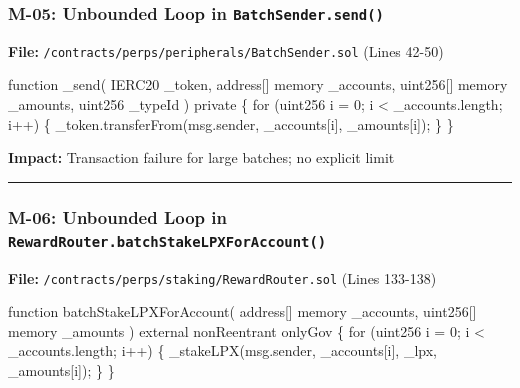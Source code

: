 \documentclass[
]{article}
\newenvironment{Shaded}{}{}
\newcommand{\NormalTok}[1]{#1}
\begin{document}
\subsubsection{\texorpdfstring{M-05: Unbounded Loop in
\texttt{BatchSender.send()}}{M-05: Unbounded Loop in BatchSender.send()}}\label{m-05-unbounded-loop-in-batchsendersend}

\textbf{File:} \texttt{/contracts/perps/peripherals/BatchSender.sol}
(Lines 42-50)

\begin{Shaded}
\begin{Highlighting}[]
\NormalTok{function \_send(}
\NormalTok{    IERC20 \_token,}
\NormalTok{    address[] memory \_accounts,}
\NormalTok{    uint256[] memory \_amounts,}
\NormalTok{    uint256 \_typeId}
\NormalTok{) private \{}
\NormalTok{    for (uint256 i = 0; i \textless{} \_accounts.length; i++) \{}
\NormalTok{        \_token.transferFrom(msg.sender, \_accounts[i], \_amounts[i]);}
\NormalTok{    \}}
\NormalTok{\}}
\end{Highlighting}
\end{Shaded}

\textbf{Impact:} Transaction failure for large batches; no explicit
limit

\begin{center}\rule{0.5\linewidth}{0.5pt}\end{center}

\subsubsection{\texorpdfstring{M-06: Unbounded Loop in
\texttt{RewardRouter.batchStakeLPXForAccount()}}{M-06: Unbounded Loop in RewardRouter.batchStakeLPXForAccount()}}\label{m-06-unbounded-loop-in-rewardrouterbatchstakelpxforaccount}

\textbf{File:} \texttt{/contracts/perps/staking/RewardRouter.sol} (Lines
133-138)

\begin{Shaded}
\begin{Highlighting}[]
\NormalTok{function batchStakeLPXForAccount(}
\NormalTok{    address[] memory \_accounts,}
\NormalTok{    uint256[] memory \_amounts}
\NormalTok{) external nonReentrant onlyGov \{}
\NormalTok{    for (uint256 i = 0; i \textless{} \_accounts.length; i++) \{}
\NormalTok{        \_stakeLPX(msg.sender, \_accounts[i], \_lpx, \_amounts[i]);}
\NormalTok{    \}}
\NormalTok{\}}
\end{Highlighting}
\end{Shaded}
\end{document}
